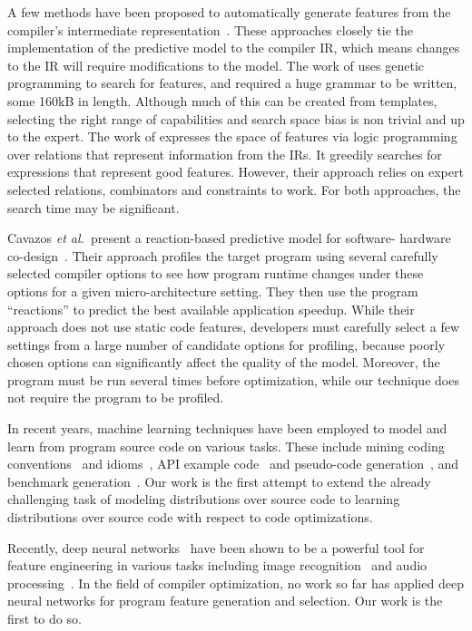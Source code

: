A few methods have been proposed to automatically generate features from the
compiler's intermediate representation~\cite{Namolaru2010a,Leather2014}. These
approaches closely tie the implementation of the predictive model to the
compiler IR, which means changes to the IR will require modifications to the
model. The work of \cite{Leather2014} uses genetic programming to search for
features, and required a huge grammar to be written, some 160kB in length.
Although much of this can be created from templates, selecting the right range
of capabilities and search space bias is non trivial and up to the expert. The
work of \cite{Namolaru2010a} expresses the space of features via logic
programming over relations that represent information from the IRs. It greedily
searches for expressions that represent good features. However, their approach
relies on expert selected relations, combinators and constraints to work. For
both approaches, the search time may be significant.

Cavazos \emph{et al.\ }present a reaction-based predictive model for software-
hardware co-design~\cite{Cavazos2006}. Their approach profiles the target
program using several carefully selected compiler options to see how program
runtime changes under these options for a given micro-architecture setting. They
then use the program ``reactions'' to predict the best available application
speedup. While their approach does not use static code features, developers must
carefully select a few settings from a large number of candidate options for
profiling, because poorly chosen options can significantly affect the quality of
the model. Moreover, the program must be run several times before optimization,
while our technique does not require the program to be profiled.

In recent years, machine learning techniques have been employed to model and
learn from program source code on various tasks. These include mining coding
conventions~\cite{Allamanis2014a} and idioms~\cite{Allamanis2014}, API example
code~\cite{Zhang2015a} and pseudo-code generation~\cite{Oda2015}, and benchmark
generation~\cite{Cummins2017a}. Our work is the first attempt to extend the
already challenging task of modeling distributions over source code to learning
distributions over source code with respect to code optimizations.

Recently, deep neural networks~\cite{LeCun2015} have been shown to be a powerful
tool for feature engineering in various tasks including image
recognition~\cite{Krizhevsky2012,He2016} and audio processing~\cite{Lee2009b}.
In the field of compiler optimization, no work so far has applied deep neural
networks for program feature generation and selection. Our work is the first to
do so.
